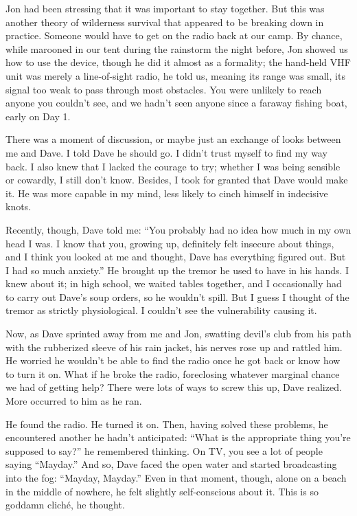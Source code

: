 Jon had been stressing that it was important to stay together. But this
was another theory of wilderness survival that appeared to be breaking
down in practice. Someone would have to get on the radio back at our
camp. By chance, while marooned in our tent during the rainstorm the
night before, Jon showed us how to use the device, though he did it
almost as a formality; the hand-held VHF unit was merely a line-of-sight
radio, he told us, meaning its range was small, its signal too weak to
pass through most obstacles. You were unlikely to reach anyone you
couldn't see, and we hadn't seen anyone since a faraway fishing boat,
early on Day 1.

There was a moment of discussion, or maybe just an exchange of looks
between me and Dave. I told Dave he should go. I didn't trust myself to
find my way back. I also knew that I lacked the courage to try; whether
I was being sensible or cowardly, I still don't know. Besides, I took
for granted that Dave would make it. He was more capable in my mind,
less likely to cinch himself in indecisive knots.

Recently, though, Dave told me: ``You probably had no idea how much in
my own head I was. I know that you, growing up, definitely felt insecure
about things, and I think you looked at me and thought, Dave has
everything figured out. But I had so much anxiety.'' He brought up the
tremor he used to have in his hands. I knew about it; in high school, we
waited tables together, and I occasionally had to carry out Dave's soup
orders, so he wouldn't spill. But I guess I thought of the tremor as
strictly physiological. I couldn't see the vulnerability causing it.

Now, as Dave sprinted away from me and Jon, swatting devil's club from
his path with the rubberized sleeve of his rain jacket, his nerves rose
up and rattled him. He worried he wouldn't be able to find the radio
once he got back or know how to turn it on. What if he broke the radio,
foreclosing whatever marginal chance we had of getting help? There were
lots of ways to screw this up, Dave realized. More occurred to him as he
ran.

He found the radio. He turned it on. Then, having solved these problems,
he encountered another he hadn't anticipated: ``What is the appropriate
thing you're supposed to say?'' he remembered thinking. On TV, you see a
lot of people saying ``Mayday.'' And so, Dave faced the open water and
started broadcasting into the fog: ``Mayday, Mayday.'' Even in that
moment, though, alone on a beach in the middle of nowhere, he felt
slightly self-conscious about it. This is so goddamn cliché, he thought.

